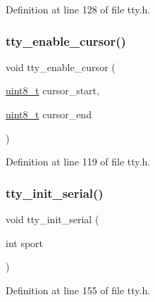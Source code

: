 Definition at line 128 of file tty.\+h.

\mbox{\label{a00035_a29a519c68d5fda10f6ca3aeaead74347_a29a519c68d5fda10f6ca3aeaead74347}} 
\subsubsection{\texorpdfstring{tty\+\_\+enable\+\_\+cursor()}{tty\_enable\_cursor()}}
{\footnotesize\ttfamily void tty\+\_\+enable\+\_\+cursor (\begin{DoxyParamCaption}\item[{\hyperlink{a00038_aba7bc1797add20fe3efdf37ced1182c5_aba7bc1797add20fe3efdf37ced1182c5}{uint8\+\_\+t}}]{cursor\+\_\+start,  }\item[{\hyperlink{a00038_aba7bc1797add20fe3efdf37ced1182c5_aba7bc1797add20fe3efdf37ced1182c5}{uint8\+\_\+t}}]{cursor\+\_\+end }\end{DoxyParamCaption})}



Definition at line 119 of file tty.\+h.

\mbox{\label{a00035_a7f3b5b4ace4add94f4bdaf99b13a88ee_a7f3b5b4ace4add94f4bdaf99b13a88ee}} 
\subsubsection{\texorpdfstring{tty\+\_\+init\+\_\+serial()}{tty\_init\_serial()}}
{\footnotesize\ttfamily void tty\+\_\+init\+\_\+serial (\begin{DoxyParamCaption}\item[{int}]{sport }\end{DoxyParamCaption})}



Definition at line 155 of file tty.\+h.

\mbox{\label{a00035_acecd7700d007e249e31d744a98eb3c7f_acecd7700d007e249e31d744a98eb3c7f}} 
